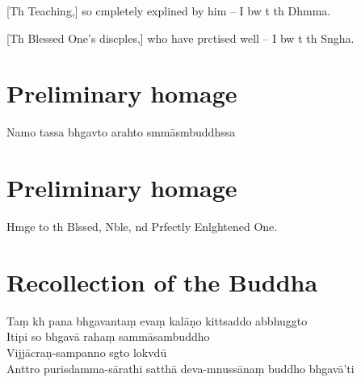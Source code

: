 
[Th Teaching,] so cmpletely explined by him -- I bw t th Dhmma.


[Th Blessed One's discples,] who have prctised well -- I bw t th Sngha.


\chapter{Preliminary homage}

\begin{leader}
\end{leader}

Namo tassa bhgavto arahto smmāsmbuddhssa


\chapter{Preliminary homage}

\begin{leader}
\end{leader}

Hmge to th Blssed, Nble, nd Prfectly Enlghtened One.


\chapter{Recollection of the Buddha}

\begin{leader}
\end{leader}

Taṃ kh pana bhgavantaṃ evaṃ kalāṇo kittsaddo abbhuggto\\
Itipi so bhgavā rahaṃ sammāsambuddho\\
Vijjācraṇ-sampanno sgto lokvdū\\
Anttro purisdamma-sārathi satthā deva-mnussānaṃ buddho bhgavā'ti

